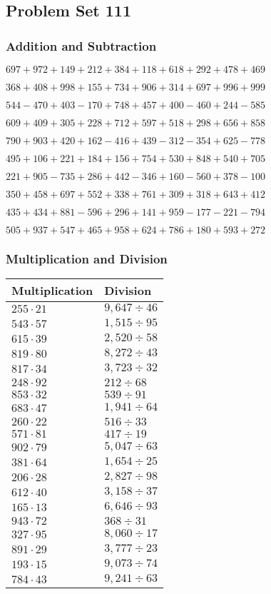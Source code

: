 \hypertarget{problem-set-111}{%
\subsection{Problem Set 111}\label{problem-set-111}}

\hypertarget{addition-and-subtraction}{%
\subsubsection{Addition and
Subtraction}\label{addition-and-subtraction}}

\(697 +972 +149 +212 +384 +118 +618 +292 +478 +469\)

\(368 +408 +998 +155 +734 +906 +314 +697 +996 +999\)

\(544 - 470 +403 - 170 +748 +457 +400 - 460 +244 - 585\)

\(609 +409 +305 +228 +712 +597 +518 +298 +656 +858\)

\(790 +903 +420 +162 - 416 +439 - 312 - 354 +625 - 778\)

\(495 +106 +221 +184 +156 +754 +530 +848 +540 +705\)

\(221 +905 - 735 +286 +442 - 346 +160 - 560 +378 - 100\)

\(350 +458 +697 +552 +338 +761 +309 +318 +643 +412\)

\(435 +434 +881 - 596 +296 +141 +959 - 177 - 221 - 794\)

\(505 +937 +547 +465 +958 +624 +786 +180 +593 +272\)

\hypertarget{multiplication-and-division}{%
\subsubsection{Multiplication and
Division}\label{multiplication-and-division}}

\begin{longtable}[]{@{}ll@{}}
\toprule
Multiplication & Division\tabularnewline
\midrule
\endhead
\(255 \cdot 21\) & \(9,647÷46\)\tabularnewline
\(543 \cdot 57\) & \(1,515÷95\)\tabularnewline
\(615 \cdot 39\) & \(2,520÷58\)\tabularnewline
\(819 \cdot 80\) & \(8,272÷43\)\tabularnewline
\(817 \cdot 34\) & \(3,723÷32\)\tabularnewline
\(248 \cdot 92\) & \(212÷68\)\tabularnewline
\(853 \cdot 32\) & \(539÷91\)\tabularnewline
\(683 \cdot 47\) & \(1,941÷64\)\tabularnewline
\(260 \cdot 22\) & \(516÷33\)\tabularnewline
\(571 \cdot 81\) & \(417÷19\)\tabularnewline
\(902 \cdot 79\) & \(5,047÷63\)\tabularnewline
\(381 \cdot 64\) & \(1,654÷25\)\tabularnewline
\(206 \cdot 28\) & \(2,827÷98\)\tabularnewline
\(612 \cdot 40\) & \(3,158÷37\)\tabularnewline
\(165 \cdot 13\) & \(6,646÷93\)\tabularnewline
\(943 \cdot 72\) & \(368÷31\)\tabularnewline
\(327 \cdot 95\) & \(8,060÷17\)\tabularnewline
\(891 \cdot 29\) & \(3,777÷23\)\tabularnewline
\(193 \cdot 15\) & \(9,073÷74\)\tabularnewline
\(784 \cdot 43\) & \(9,241÷63\)\tabularnewline
\bottomrule
\end{longtable}
